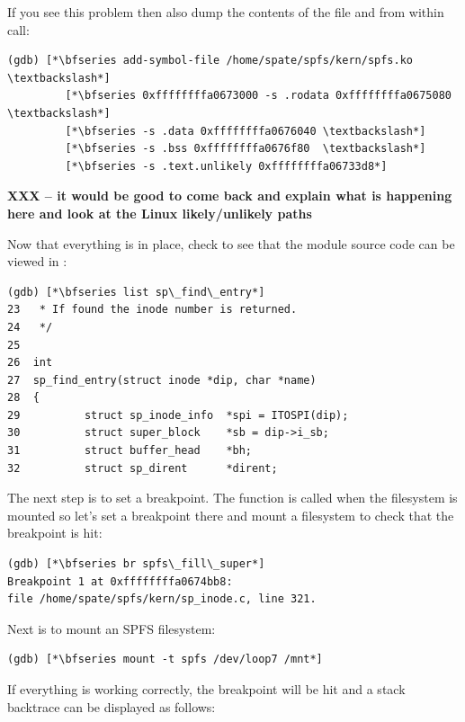 \noindent
If you see this problem then also dump the contents of the file  and from within  call:

\begin{lstlisting}
(gdb) [*\bfseries add-symbol-file /home/spate/spfs/kern/spfs.ko \textbackslash*]
         [*\bfseries 0xffffffffa0673000 -s .rodata 0xffffffffa0675080 \textbackslash*]
         [*\bfseries -s .data 0xffffffffa0676040 \textbackslash*]
         [*\bfseries -s .bss 0xffffffffa0676f80  \textbackslash*]
         [*\bfseries -s .text.unlikely 0xffffffffa06733d8*]
\end{lstlisting}

\noindent
\textbf{XXX -- it would be good to come back and explain what is happening here and look at the Linux likely/unlikely paths}

Now that everything is in place, check to see that the module source code can be viewed in :

\begin{lstlisting}
(gdb) [*\bfseries list sp\_find\_entry*]
23	 * If found the inode number is returned.
24	 */
25	
26	int
27	sp_find_entry(struct inode *dip, char *name)
28	{
29          struct sp_inode_info  *spi = ITOSPI(dip);
30          struct super_block    *sb = dip->i_sb;
31          struct buffer_head    *bh;
32          struct sp_dirent	  *dirent;
\end{lstlisting}

\noindent
The next step is to set a breakpoint. The function  is called when the filesystem is mounted so let's set a breakpoint there and mount a filesystem to check that the breakpoint is hit:

\begin{lstlisting}
(gdb) [*\bfseries br spfs\_fill\_super*]
Breakpoint 1 at 0xffffffffa0674bb8: 
file /home/spate/spfs/kern/sp_inode.c, line 321.
\end{lstlisting}

\noindent
Next is to mount an SPFS filesystem:

\begin{lstlisting}
(gdb) [*\bfseries mount -t spfs /dev/loop7 /mnt*]
\end{lstlisting}

\noindent
If everything is working correctly, the breakpoint will be hit and a stack backtrace can be displayed as follows:

